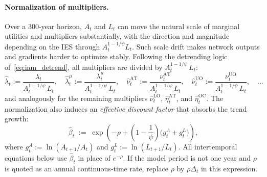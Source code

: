 \documentclass[11pt,a4paper]{report}
\begin{document}
\paragraph{Normalization of multipliers.}
Over a 300-year horizon, $A_t$ and $L_t$ can move the natural scale of marginal utilities and multipliers substantially, with the direction and magnitude depending on the IES through $A_t^{1-1/\psi}L_t$.  Such scale drift makes network outputs and gradients harder to optimize stably.  Following the detrending logic of~\eqref{eq:iam_detrend}, all multipliers are divided by $A_t^{1-1/\psi}\,L_t$:
\begin{equation}
\hat{\lambda}_t := \frac{\lambda_t}{A_t^{1-1/\psi}\,L_t},\quad
\hat{\lambda}^\mu_t := \frac{\lambda^\mu_t}{A_t^{1-1/\psi}\,L_t},\quad
\hat{\nu}^{\mathrm{AT}}_t := \frac{\nu^{\mathrm{AT}}_t}{A_t^{1-1/\psi}\,L_t},\quad
\hat{\nu}^{\mathrm{UO}}_t := \frac{\nu^{\mathrm{UO}}_t}{A_t^{1-1/\psi}\,L_t},\quad \ldots
\label{eq:iam_norm_mult}
\end{equation}
and analogously for the remaining multipliers $\hat{\nu}^{\mathrm{LO}}_t$, $\hat{\eta}^{\mathrm{AT}}_t$, and $\hat{\eta}^{\mathrm{OC}}_t$.  The normalization also induces an \emph{effective discount factor} that absorbs the trend growth:
\begin{equation}
\hat{\beta}_t \;:=\; \exp\!\left(-\rho + \left(1-\frac{1}{\psi}\right)\!\bigl(g^A_t + g^L_t\bigr)\right),
\label{eq:iam_eff_beta}
\end{equation}
where $g^A_t := \ln(A_{t+1}/A_t)$ and $g^L_t := \ln(L_{t+1}/L_t)$.  All intertemporal equations below use $\hat{\beta}_t$ in place of $e^{-\rho}$.
If the model period is not one year and $\rho$ is quoted as an annual continuous-time rate, replace $\rho$ by $\rho\Delta_t$ in this expression.
\end{document}
